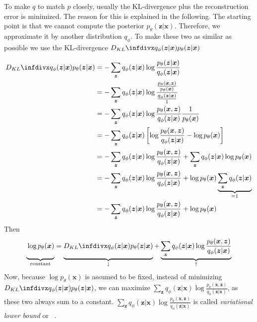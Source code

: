 To make $q$ to match $p$ closely, usually the \ac{KL-divergence} plus the reconstruction error is minimized.
The reason for this is explained in the following.
The starting point is that we cannot compute the posterior $p_\theta(\bm{z}|\bm{x})$.
Therefore, we approximate it by another distribution $q_\phi$.
To make these two as similar as possible we use the \ac{KL-divergence} $\kldiv{q_\phi(\bm{z}|\bm{x})}{p_\theta(\bm{z}|\bm{x})}$

\begin{align}
    \kldiv{q_\phi(\bm{z}|\bm{x})}{p_\theta(\bm{z}|\bm{x})} &= -\sum_{\bm{z}} q_\phi(\bm{z}|\bm{x}) \log \frac{p_\theta(\bm{z}|\bm{x})}{q_\phi(\bm{z}|\bm{x})} \\
    &= -\sum_{\bm{z}} q_\phi(\bm{z}|\bm{x}) \log \frac{\frac{p_\theta(\bm{x},\bm{z})}{p_\theta(\bm{x})}}{\frac{q_\phi(\bm{z}|\bm{x})}{1}}\\
    &= -\sum_{\bm{z}} q_\phi(\bm{z}|\bm{x}) \log \frac{p_\theta(\bm{x},\bm{z})}{q_\phi(\bm{z}|\bm{x})}\frac{1}{p_\theta(\bm{x})}\\
    &= -\sum_{\bm{z}} q_\phi(\bm{z}|\bm{x}) \left[ \log \frac{p_\theta(\bm{x},\bm{z})}{q_\phi(\bm{z}|\bm{x})} - \log p_\theta(\bm{x}) \right]\\
    &= -\sum_{\bm{z}} q_\phi(\bm{z}|\bm{x}) \log \frac{p_\theta(\bm{x},\bm{z})}{q_\phi(\bm{z}|\bm{x})} + \sum_{\bm{z}} q_\phi(\bm{z}|\bm{x}) \log p_\theta(\bm{x}) \\
    &= -\sum_{\bm{z}} q_\phi(\bm{z}|\bm{x}) \log \frac{p_\theta(\bm{x},\bm{z})}{q_\phi(\bm{z}|\bm{x})} + \log p_\theta(\bm{x}) \underbrace{\sum_{\bm{z}} q_\phi(\bm{z}|\bm{x})}_{=1} \\
    &= -\sum_{\bm{z}} q_\phi(\bm{z}|\bm{x}) \log \frac{p_\theta(\bm{x},\bm{z})}{q_\phi(\bm{z}|\bm{x})} + \log p_\theta(\bm{x})
\end{align}
Then
\begin{align}
    \underbrace{\vphantom{\sum_{\bm{z}} x}\log p_\theta(\bm{x})}_{\text{constant}} =  \underbrace{\vphantom{\sum_{\bm{z}} x}\kldiv{q_\phi(\bm{z}|\bm{x})}{p_\theta(\bm{z}|\bm{x})}}_{\downarrow}  + \underbrace{\sum_{\bm{z}} q_\phi(\bm{z}|\bm{x}) \log \frac{p_\theta(\bm{x},\bm{z})}{q_\phi(\bm{z}|\bm{x})}}_{\uparrow}
\end{align}
Now, because $\log p_\theta(\bm{x})$ is assumed to be fixed, instead of minimizing $\kldiv{q_\phi(\bm{z}|\bm{x})}{p_\theta(\bm{z}|\bm{x})}$, we can maximize $\sum_{\bm{z}} q_\phi(\bm{z}|\bm{x}) \log \frac{p_\theta(\bm{x},\bm{z})}{q_\phi(\bm{z}|\bm{x})}$, as these two always sum to a constant.
$\sum_{\bm{z}} q_\phi(\bm{z}|\bm{x}) \log \frac{p_\theta(\bm{x},\bm{z})}{q_\phi(\bm{z}|\bm{x})}$ is called \textit{variational lower bound} or ~\citep[p. 18]{kingma2019introduction}.

